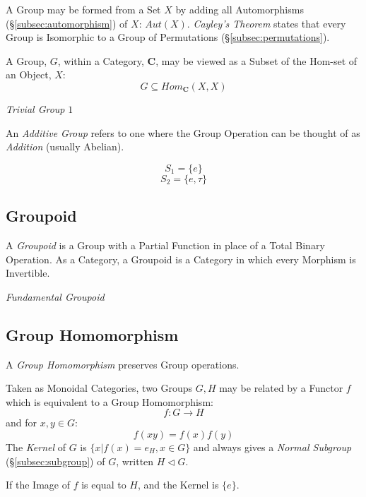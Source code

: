 A Group may be formed from a Set $X$ by adding all Automorphisms
(\S\ref{subsec:automorphism}) of $X$: $Aut(X)$. \emph{Cayley's
  Theorem} states that every Group is Isomorphic to a Group of
Permutations (\S\ref{subsec:permutations}).

A Group, $G$, within a Category, $\mathbf{C}$, may be viewed as a
Subset of the Hom-set of an Object, $X$:
\[
    G \subseteq Hom_{\mathbf{C}}(X,X)
\]

\emph{Trivial Group} ${1}$

An \emph{Additive Group} refers to one where the Group Operation can
be thought of as \emph{Addition} (usually Abelian).

\[
    S_1 = \{e\}
\] \[
    S_2 = \{e, \tau\}
\]



\subsection{Groupoid}\label{subsec:groupoid}

A \emph{Groupoid} is a Group with a Partial Function in place of a
Total Binary Operation. As a Category, a Groupoid is a Category in
which every Morphism is Invertible.

\emph{Fundamental Groupoid}



\subsection{Group Homomorphism}\label{subsec:group_homomorphism}

A \emph{Group Homomorphism} preserves Group operations.

Taken as Monoidal Categories, two Groups $G, H$ may be related by a
Functor $f$ which is equivalent to a Group Homomorphism:
\[
    f : G \rightarrow H
\]
and for $x,y \in G$:
\[
    f(xy) = f(x)f(y)
\]
The \emph{Kernel} of $G$ is $\{x | f(x)=e_H, x \in G\}$ and always
gives a \emph{Normal Subgroup} (\S\ref{subsec:subgroup}) of $G$,
written $H \triangleleft G$.

If the Image of $f$ is equal to $H$, and the Kernel is $\{e\}$.



